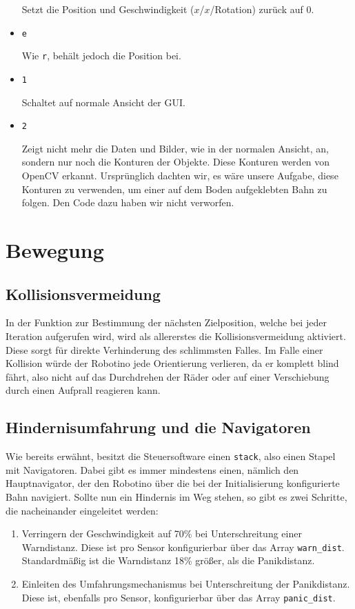 \begin{itemize}
		Setzt die Position und Geschwindigkeit ($x$/$x$/Rotation) zurück auf 0.

	\item \verb|e|

		Wie \verb|r|, behält jedoch die Position bei.

	\item \verb|1|

		Schaltet auf normale Ansicht der GUI.

	\item \verb|2|

		Zeigt nicht mehr die Daten und Bilder, wie in der normalen Ansicht, an,
		sondern nur noch die Konturen der Objekte. Diese Konturen werden von
		OpenCV erkannt. Ursprünglich dachten wir, es wäre unsere Aufgabe, diese
		Konturen zu verwenden, um einer auf dem Boden aufgeklebten Bahn zu
		folgen. Den Code dazu haben wir nicht verworfen.
\end{itemize}


\section{Bewegung}

\subsection{Kollisionsvermeidung}

In der Funktion zur Bestimmung der nächsten Zielposition, welche bei jeder
Iteration aufgerufen wird, wird als allererstes die Kollisionsvermeidung
aktiviert. Diese sorgt für direkte Verhinderung des schlimmsten Falles. Im
Falle einer Kollision würde der Robotino jede Orientierung verlieren, da er
komplett blind fährt, also nicht auf das Durchdrehen der Räder oder auf einer
Verschiebung durch einen Aufprall reagieren kann.


\subsection{Hindernisumfahrung und die Navigatoren}

Wie bereits erwähnt, besitzt die Steuersoftware einen \verb|stack|, also einen
Stapel mit Navigatoren. Dabei gibt es immer mindestens einen, nämlich den
Hauptnavigator, der den Robotino über die bei der Initialisierung konfigurierte
Bahn navigiert. Sollte nun ein Hindernis im Weg stehen, so gibt es zwei
Schritte, die nacheinander eingeleitet werden:

\begin{enumerate}
	\item Verringern der Geschwindigkeit auf 70\% bei Unterschreitung einer
		Warndistanz. Diese ist pro Sensor konfigurierbar über das Array
		\verb|warn_dist|. Standardmäßig ist die Warndistanz 18\% größer, als die
		Panikdistanz.
	\item Einleiten des Umfahrungsmechanismus bei Unterschreitung der
		Panikdistanz. Diese ist, ebenfalls pro Sensor, konfigurierbar über das
		Array \verb|panic_dist|.
\end{enumerate}

